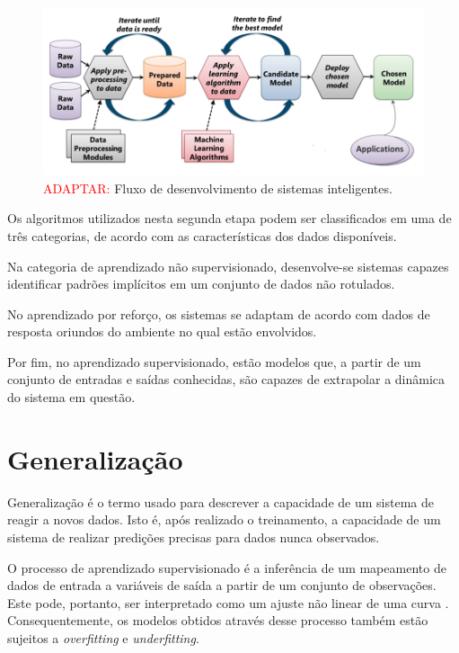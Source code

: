 \begin{figure}[H]
    \caption{\textcolor{red}{ADAPTAR:} Fluxo de desenvolvimento de sistemas inteligentes. }
    \begin{center}
    \includegraphics[width=\linewidth]{imgs/intro/MLFlow.png}
    \end{center}
    \label{fig:mlflow}
\end{figure}

Os algoritmos utilizados nesta segunda etapa podem ser classificados em uma de três categorias, de acordo com as características dos dados disponíveis. \cite{ai_modern}

Na categoria de aprendizado não supervisionado, desenvolve-se sistemas capazes identificar padrões implícitos em um conjunto de dados não rotulados.

No aprendizado por reforço, os sistemas se adaptam de acordo com dados de resposta oriundos do ambiente no qual estão envolvidos.

Por fim, no aprendizado supervisionado, estão modelos que, a partir de um conjunto de entradas e saídas conhecidas, são capazes de extrapolar a dinâmica do sistema em questão.


\section{Generalização}

Generalização é o termo usado para descrever a capacidade de um sistema de reagir a novos dados. Isto é, após realizado o treinamento, a capacidade de um sistema de realizar predições precisas para dados nunca observados.

O processo de aprendizado supervisionado é a inferência de um mapeamento de dados de entrada a variáveis de saída a partir de um conjunto de observações. Este pode, portanto, ser interpretado como um ajuste não linear de uma curva \cite{haykin}. Consequentemente, os modelos obtidos através desse processo também estão sujeitos a \textit{overfitting} e \textit{underfitting}.

